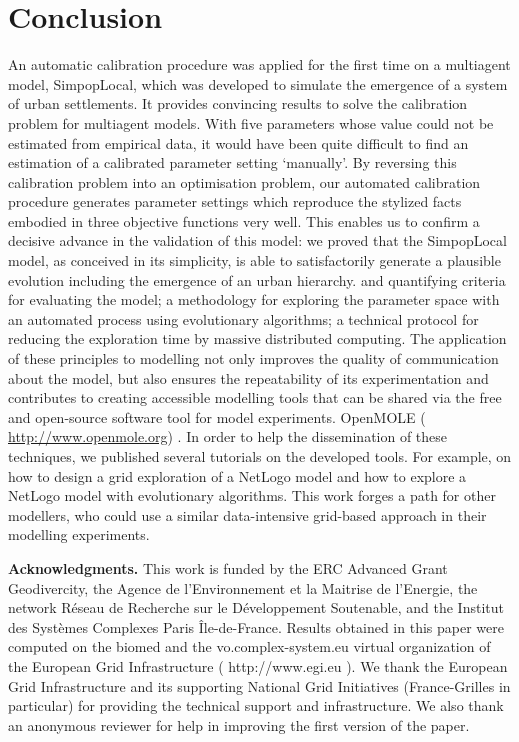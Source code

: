 \section{Conclusion}
\label{sec:conlusion}

An automatic calibration procedure was applied for the first time on a multiagent model, SimpopLocal, which was developed to simulate the emergence of a system of urban settlements. It provides convincing results to solve the calibration problem for multiagent models. With five parameters whose value could not be estimated from empirical data, it would have been quite difficult to find an estimation of a calibrated parameter setting ‘manually’. By reversing this calibration problem into an optimisation problem, our automated calibration procedure generates parameter settings which reproduce the stylized facts embodied in three objective functions very well. This enables us to confirm a decisive advance in the validation of this model: we proved that the SimpopLocal model, as conceived in its simplicity, is able to satisfactorily generate a plausible evolution including the emergence of an urban hierarchy. and quantifying criteria for evaluating the model; a methodology for exploring the parameter space with an automated process using evolutionary algorithms; a technical protocol for reducing the exploration time by massive distributed computing. The application of these principles to modelling not only improves the quality of communication about the model, but also ensures the repeatability of its experimentation and contributes to creating accessible modelling tools that can be shared via the free and open-source software tool for model experiments. OpenMOLE ( \href{http://www.openmole.org}{http://www.openmole.org}) . In order to help the dissemination of these techniques, we published several tutorials on the developed tools. For example, on how to design a grid exploration of a NetLogo model  and how to explore a NetLogo model with evolutionary algorithms.  This work forges a path for other modellers, who could use a similar data-intensive grid-based approach in their modelling experiments.

\textbf{Acknowledgments.} This work is funded by the ERC Advanced Grant Geodivercity, the Agence de l’Environnement et la Maitrise de l’Energie, the network Réseau de Recherche sur le Développement Soutenable, and the Institut des Systèmes Complexes Paris Île-de-France. Results obtained in this paper were computed on the biomed and the vo.complex-system.eu virtual organization of the European Grid Infrastructure ( http://www.egi.eu ). We thank the European Grid Infrastructure and its supporting National Grid Initiatives (France-Grilles in particular) for providing the technical support and infrastructure. We also thank an anonymous reviewer for help in improving the first version of the paper.

